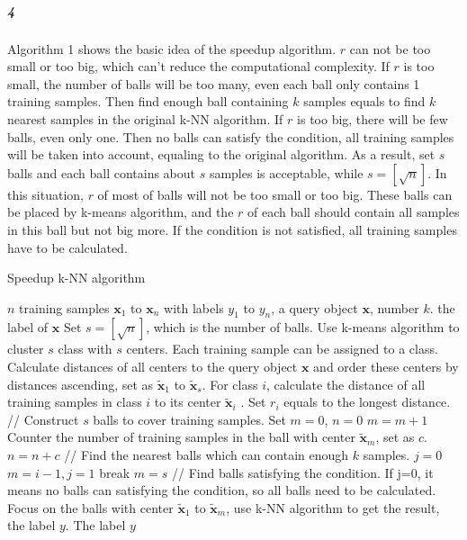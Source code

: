 \documentclass[22pt]{article}
\begin{document}
		\subparagraph{4} Algorithm 1 shows the basic idea of the speedup algorithm. $r$ can not be too small or too big, which can't reduce the computational complexity. If $r$ is too small, the number of balls will be too many, even each ball only contains 1 training samples. Then find enough ball containing $k$ samples equals to find $k$ nearest samples in the original k-NN algorithm. If $r$ is too big, there will be few balls, even only one. Then no balls can satisfy the condition, all training samples will be taken into account, equaling to the original algorithm. As a result, set $s$ balls and each ball contains about $s$ samples is acceptable, while $s = [\sqrt{n}]$. In this situation, $r$ of most of balls will not be too small or too big. These balls can be placed by k-means algorithm, and the $r$ of each ball should contain all samples in this ball but not big more. If the condition is not satisfied, all training samples have to be calculated.
 		\begin{algorithm}
			\caption{Speedup k-NN algorithm}
			\begin{algorithmic}[1]
			\REQUIRE $n$ training samples $\mathbf{x}_1$ to $\mathbf{x}_n$ with labels $y_1$ to $y_n$, a query object $\mathbf{x}$, number $k$.
			\ENSURE the label of $\mathbf{x}$
			\STATE Set $s = [\sqrt{n}]$, which is the number of balls.
			\STATE Use k-means algorithm to cluster $s$ class with $s$ centers. Each training sample can be assigned to a class.
			\STATE Calculate distances of all centers to the query object $\mathbf{x}$ and order these centers by distances ascending, set as $\tilde{\mathbf{x}}_1$ to $\tilde{\mathbf{x}}_s$.
			\STATE For class $i$, calculate the distance of all training samples in class $i$ to its center $\tilde{\mathbf{x}}_i$ . Set $r_i$ equals to the longest distance.
			\ENDFOR  
			\STATE // Construct $s$ balls to cover training samples.
			\STATE Set $m=0$, $n = 0$
			\STATE $m = m+1$
			\STATE  Counter the number of training samples in the ball with center $\tilde{\mathbf{x}}_m$, set as $c$.
			\STATE $n = n+c$
			\ENDWHILE
			\STATE // Find the nearest balls which can contain enough $k$ samples.
			\STATE $j = 0$
			\STATE $m = i-1, j =1$
			\STATE break
			\ENDIF
			\ENDFOR
			\STATE $m = s$
			\ENDIF
			\STATE // Find balls satisfying the condition. If j=0, it means no balls can satisfying the condition, so all balls need to be calculated.
			\STATE Focus on the balls with center $\tilde{\mathbf{x}}_1$ to $\tilde{\mathbf{x}}_m$, use k-NN algorithm to get the result, the label $y$.
			\RETURN The label $y$
			\end{algorithmic}
			\end{algorithm}
\end{document}
